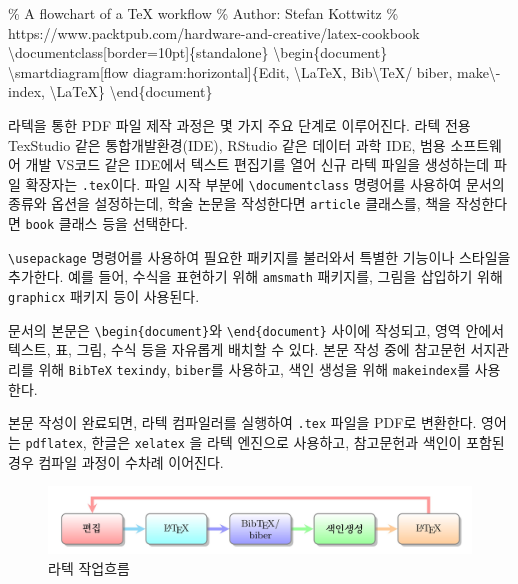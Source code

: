 \documentclass[
  letterpaper,
]{book}
\newenvironment{Shaded}{\begin{snugshade}}{\end{snugshade}}
\newcommand{\BuiltInTok}[1]{\textcolor[rgb]{0.00,0.23,0.31}{#1}}
\newcommand{\CommentTok}[1]{\textcolor[rgb]{0.37,0.37,0.37}{#1}}
\newcommand{\ExtensionTok}[1]{\textcolor[rgb]{0.00,0.23,0.31}{#1}}
\newcommand{\FunctionTok}[1]{\textcolor[rgb]{0.28,0.35,0.67}{#1}}
\newcommand{\KeywordTok}[1]{\textcolor[rgb]{0.00,0.23,0.31}{#1}}
\newcommand{\NormalTok}[1]{\textcolor[rgb]{0.00,0.23,0.31}{#1}}
\begin{document}
\begin{Shaded}
\begin{Highlighting}[]
\CommentTok{\% A flowchart of a TeX workflow}
\CommentTok{\% Author: Stefan Kottwitz}
\CommentTok{\% https://www.packtpub.com/hardware{-}and{-}creative/latex{-}cookbook}
\BuiltInTok{\textbackslash{}documentclass}\NormalTok{[border=10pt]\{}\ExtensionTok{standalone}\NormalTok{\}}
\KeywordTok{\textbackslash{}begin}\NormalTok{\{}\ExtensionTok{document}\NormalTok{\}}
\FunctionTok{\textbackslash{}smartdiagram}\NormalTok{[flow diagram:horizontal]\{Edit,}
  \FunctionTok{\textbackslash{}LaTeX}\NormalTok{, Bib}\FunctionTok{\textbackslash{}TeX}\NormalTok{/ biber, make}\FunctionTok{\textbackslash{}{-}}\NormalTok{index, }\FunctionTok{\textbackslash{}LaTeX}\NormalTok{\}}
\KeywordTok{\textbackslash{}end}\NormalTok{\{}\ExtensionTok{document}\NormalTok{\}}
\end{Highlighting}
\end{Shaded}

라텍을 통한 PDF 파일 제작 과정은 몇 가지 주요 단계로 이루어진다. 라텍
전용 TexStudio 같은 통합개발환경(IDE), RStudio 같은 데이터 과학 IDE,
범용 소프트웨어 개발 VS코드 같은 IDE에서 텍스트 편집기를 열어 신규 라텍
파일을 생성하는데 파일 확장자는 \texttt{.tex}이다. 파일 시작 부분에
\texttt{\textbackslash{}documentclass} 명령어를 사용하여 문서의 종류와
옵션을 설정하는데, 학술 논문을 작성한다면 \texttt{article} 클래스를,
책을 작성한다면 \texttt{book} 클래스 등을 선택한다.

\texttt{\textbackslash{}usepackage} 명령어를 사용하여 필요한 패키지를
불러와서 특별한 기능이나 스타일을 추가한다. 예를 들어, 수식을 표현하기
위해 \texttt{amsmath} 패키지를, 그림을 삽입하기 위해 \texttt{graphicx}
패키지 등이 사용된다.

문서의 본문은 \texttt{\textbackslash{}begin\{document\}}와
\texttt{\textbackslash{}end\{document\}} 사이에 작성되고, 영역 안에서
텍스트, 표, 그림, 수식 등을 자유롭게 배치할 수 있다. 본문 작성 중에
참고문헌 서지관리를 위해 \texttt{BibTeX} \texttt{texindy},
\texttt{biber}를 사용하고, 색인 생성을 위해 \texttt{makeindex}를
사용한다.

본문 작성이 완료되면, 라텍 컴파일러를 실행하여 \texttt{.tex} 파일을
PDF로 변환한다. 영어는 \texttt{pdflatex}, 한글은 \texttt{xelatex} 을
라텍 엔진으로 사용하고, 참고문헌과 색인이 포함된 경우 컴파일 과정이
수차례 이어진다.

\begin{figure}

{\centering \includegraphics{images/latex_workflow.jpg}

}

\caption{라텍 작업흐름}

\end{figure}
\end{document}

